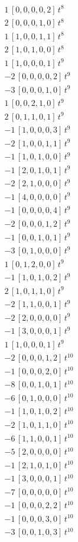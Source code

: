 \begin{align*}
1\,[0,0,0,0,2]\,t^{8} \\
2\,[0,0,0,1,0]\,t^{8} \\
1\,[1,0,0,1,1]\,t^{8} \\
2\,[1,0,1,0,0]\,t^{8} \\
1\,[1,0,0,0,1]\,t^{9} \\
-2\,[0,0,0,0,2]\,t^{9} \\
-3\,[0,0,0,1,0]\,t^{9} \\
1\,[0,0,2,1,0]\,t^{9} \\
2\,[0,1,1,0,1]\,t^{9} \\
-1\,[1,0,0,0,3]\,t^{9} \\
-2\,[1,0,0,1,1]\,t^{9} \\
-1\,[1,0,1,0,0]\,t^{9} \\
-1\,[2,0,1,0,1]\,t^{9} \\
-2\,[2,1,0,0,0]\,t^{9} \\
-1\,[4,0,0,0,0]\,t^{9} \\
-1\,[0,0,0,0,4]\,t^{9} \\
-2\,[0,0,0,1,2]\,t^{9} \\
-1\,[0,0,1,0,1]\,t^{9} \\
-3\,[0,1,0,0,0]\,t^{9} \\
1\,[0,1,2,0,0]\,t^{9} \\
-1\,[1,0,1,0,2]\,t^{9} \\
2\,[1,0,1,1,0]\,t^{9} \\
-2\,[1,1,0,0,1]\,t^{9} \\
-2\,[2,0,0,0,0]\,t^{9} \\
-1\,[3,0,0,0,1]\,t^{9} \\
1\,[1,0,0,0,1]\,t^{9} \\
-2\,[0,0,0,1,2]\,t^{10} \\
-1\,[0,0,0,2,0]\,t^{10} \\
-8\,[0,0,1,0,1]\,t^{10} \\
-6\,[0,1,0,0,0]\,t^{10} \\
-1\,[1,0,1,0,2]\,t^{10} \\
-2\,[1,0,1,1,0]\,t^{10} \\
-6\,[1,1,0,0,1]\,t^{10} \\
-5\,[2,0,0,0,0]\,t^{10} \\
-1\,[2,1,0,1,0]\,t^{10} \\
-1\,[3,0,0,0,1]\,t^{10} \\
-7\,[0,0,0,0,0]\,t^{10} \\
-1\,[0,0,0,2,2]\,t^{10} \\
-1\,[0,0,0,3,0]\,t^{10} \\
-3\,[0,0,1,0,3]\,t^{10} \\

\end{align*}
